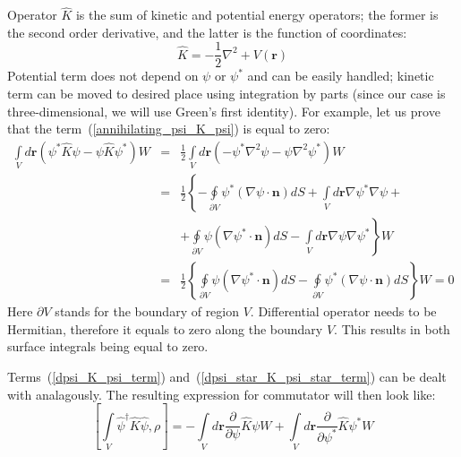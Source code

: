 \documentclass[12pt,notitlepage]{report}
\begin{document}
Operator $\hat{K}$ is the sum of kinetic and potential energy operators;
the former is the second order derivative, and the latter is the function of coordinates:
\[ \hat{K} = - \frac{1}{2} \nabla^2 + V(\textbf{r}) \]
Potential term does not depend on $\psi$ or $\psi^*$ and can be easily handled;
kinetic term can be moved to desired place using integration by parts
(since our case is three-dimensional, we will use Green's first identity).
For example, let us prove that the term~(\ref{annihilating_psi_K_psi}) is equal to zero:
\begin{eqnarray*}
\int\limits_V d\textbf{r} \left( \psi^* \hat{K} \psi - \psi \hat{K} \psi^* \right) W
& = & \frac{1}{2} \int\limits_V d\textbf{r} \left( - \psi^* \nabla^2 \psi - \psi \nabla^2 \psi^* \right) W \\
& = & \frac{1}{2} \left\{ - \oint\limits_{\partial V} \psi^* (\nabla \psi \cdot \textbf{n}) dS +
\int\limits_V d\textbf{r} \nabla \psi^* \nabla \psi \right. + \\
& & \left. + \oint\limits_{\partial V} \psi (\nabla \psi^* \cdot \textbf{n}) dS -
\int\limits_V d\textbf{r} \nabla \psi \nabla \psi^* \right\} W \\
& = & \frac{1}{2} \left\{ \oint\limits_{\partial V} \psi (\nabla \psi^* \cdot \textbf{n}) dS -
\oint\limits_{\partial V} \psi^* (\nabla \psi \cdot \textbf{n}) dS \right\} W = 0
\end{eqnarray*}
Here $\partial V$ stands for the boundary of region $V$.
Differential operator needs to be Hermitian, therefore it equals to zero along the boundary $V$.
This results in both surface integrals being equal to zero. 

Terms~(\ref{dpsi_K_psi_term}) and~(\ref{dpsi_star_K_psi_star_term}) can be dealt with analagously.
The resulting expression for commutator will then look like:
\[
[ \int\limits_V \hat{\psi}^\dagger \hat{K} \hat{\psi}, \rho ]  = - \int\limits_V d\textbf{r} \frac{\partial}{\partial\psi} \hat{K} \psi W +
\int\limits_V d\textbf{r} \frac{\partial}{\partial\psi^*} \hat{K} \psi^* W
\]
\end{document}

